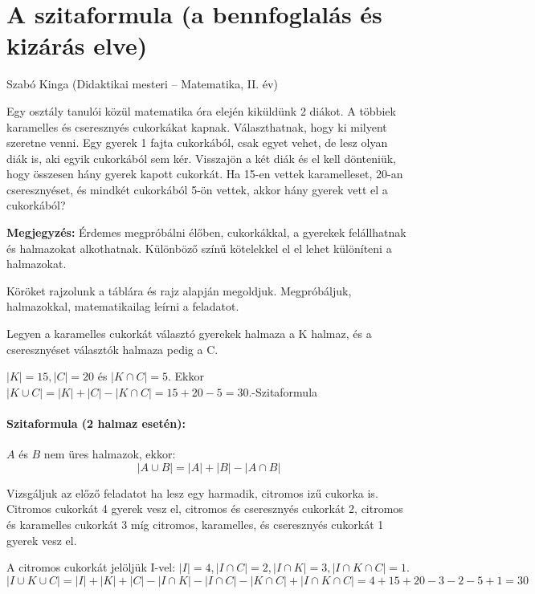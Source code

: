 
\chapter{A szitaformula (a bennfoglalás és kizárás elve)}\label{chap:szita}
\begin{description}
{\large \item [{Szerző:}] Szabó Kinga (Didaktikai mesteri -- Matematika, II. év)}
\end{description}

\begin{problem}
Egy osztály tanulói közül matematika óra elején kiküldünk 2 diákot.
A többiek karamelles és cseresznyés cukorkákat kapnak. Választhatnak,
hogy ki milyent szeretne venni. Egy gyerek 1 fajta cukorkából, csak
egyet vehet, de lesz olyan diák is, aki egyik cukorkából sem kér.
Visszajön a két diák és el kell dönteniük, hogy összesen hány gyerek
kapott cukorkát. Ha 15-en vettek karamelleset, 20-an cseresznyéset,
és mindkét cukorkából 5-ön vettek, akkor hány gyerek vett el a cukorkából?
\vspace{3mm}

\textbf{Megjegyzés:} Érdemes megpróbálni élőben, cukorkákkal, a gyerekek
felállhatnak és halmazokat alkothatnak. Különböző színű kötelekkel
el el lehet különíteni a halmazokat. \vspace{3mm}
\end{problem}
\begin{solution}
Köröket rajzolunk a táblára és rajz alapján megoldjuk. Megpróbáljuk,
halmazokkal, matematikailag leírni a feladatot.

Legyen a karamelles cukorkát választó gyerekek halmaza a K halmaz,
és a cseresznyéset választók halmaza pedig a C.

$|K|=15,|C|=20$ és $|K\cap C|=5$. Ekkor $|K\cup C|=|K|+|C|-|K\cap C|=15+20-5=30$.-Szitaformula
\end{solution}
\subsubsection*{Szitaformula (2 halmaz esetén):}

$A$ és $B$ nem üres halmazok, ekkor: 
\[
|A\cup B|=|A|+|B|-|A\cap B|
\]
\begin{problem}
Vizsgáljuk az előző feladatot ha lesz egy harmadik,
citromos izű cukorka is. Citromos cukorkát 4 gyerek vesz el, citromos
és cseresznyés cukorkát 2, citromos és karamelles cukorkát 3 míg citromos,
karamelles, és cseresznyés cukorkát 1 gyerek vesz el. \vspace{5mm}
\end{problem}
\begin{solution}
A citromos cukorkát jelöljük I-vel: $|I|=4,|I\cap C|=2,|I\cap K|=3,|I\cap K\cap C|=1.$
\[
|I\cup K\cup C|=|I|+|K|+|C|-|I\cap K|-|I\cap C|-|K\cap C|+|I\cap K\cap C|=4+15+20-3-2-5+1=30
\]
\end{solution}

